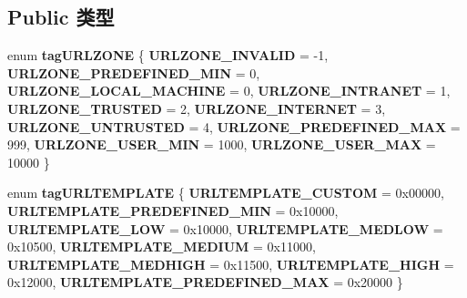 \subsection*{Public 类型}
\begin{DoxyCompactItemize}
\item 
\mbox{\label{interface_i_internet_zone_manager_ad4aaee0934edd487d60c9696d885b2a9}} 
enum {\bfseries tag\+U\+R\+L\+Z\+O\+NE} \{ \newline
{\bfseries U\+R\+L\+Z\+O\+N\+E\+\_\+\+I\+N\+V\+A\+L\+ID} = -\/1, 
{\bfseries U\+R\+L\+Z\+O\+N\+E\+\_\+\+P\+R\+E\+D\+E\+F\+I\+N\+E\+D\+\_\+\+M\+IN} = 0, 
{\bfseries U\+R\+L\+Z\+O\+N\+E\+\_\+\+L\+O\+C\+A\+L\+\_\+\+M\+A\+C\+H\+I\+NE} = 0, 
{\bfseries U\+R\+L\+Z\+O\+N\+E\+\_\+\+I\+N\+T\+R\+A\+N\+ET} = 1, 
\newline
{\bfseries U\+R\+L\+Z\+O\+N\+E\+\_\+\+T\+R\+U\+S\+T\+ED} = 2, 
{\bfseries U\+R\+L\+Z\+O\+N\+E\+\_\+\+I\+N\+T\+E\+R\+N\+ET} = 3, 
{\bfseries U\+R\+L\+Z\+O\+N\+E\+\_\+\+U\+N\+T\+R\+U\+S\+T\+ED} = 4, 
{\bfseries U\+R\+L\+Z\+O\+N\+E\+\_\+\+P\+R\+E\+D\+E\+F\+I\+N\+E\+D\+\_\+\+M\+AX} = 999, 
\newline
{\bfseries U\+R\+L\+Z\+O\+N\+E\+\_\+\+U\+S\+E\+R\+\_\+\+M\+IN} = 1000, 
{\bfseries U\+R\+L\+Z\+O\+N\+E\+\_\+\+U\+S\+E\+R\+\_\+\+M\+AX} = 10000
 \}
\item 
\mbox{\label{interface_i_internet_zone_manager_a1b3779998e11492540c44f4df7c2167e}} 
enum {\bfseries tag\+U\+R\+L\+T\+E\+M\+P\+L\+A\+TE} \{ \newline
{\bfseries U\+R\+L\+T\+E\+M\+P\+L\+A\+T\+E\+\_\+\+C\+U\+S\+T\+OM} = 0x00000, 
{\bfseries U\+R\+L\+T\+E\+M\+P\+L\+A\+T\+E\+\_\+\+P\+R\+E\+D\+E\+F\+I\+N\+E\+D\+\_\+\+M\+IN} = 0x10000, 
{\bfseries U\+R\+L\+T\+E\+M\+P\+L\+A\+T\+E\+\_\+\+L\+OW} = 0x10000, 
{\bfseries U\+R\+L\+T\+E\+M\+P\+L\+A\+T\+E\+\_\+\+M\+E\+D\+L\+OW} = 0x10500, 
\newline
{\bfseries U\+R\+L\+T\+E\+M\+P\+L\+A\+T\+E\+\_\+\+M\+E\+D\+I\+UM} = 0x11000, 
{\bfseries U\+R\+L\+T\+E\+M\+P\+L\+A\+T\+E\+\_\+\+M\+E\+D\+H\+I\+GH} = 0x11500, 
{\bfseries U\+R\+L\+T\+E\+M\+P\+L\+A\+T\+E\+\_\+\+H\+I\+GH} = 0x12000, 
{\bfseries U\+R\+L\+T\+E\+M\+P\+L\+A\+T\+E\+\_\+\+P\+R\+E\+D\+E\+F\+I\+N\+E\+D\+\_\+\+M\+AX} = 0x20000
 \}
\item 
\mbox{\label{interface_i_internet_zone_manager_a08329ac5c6ee36177b014fa696a4ef37}} 

\end{DoxyCompactItemize}

